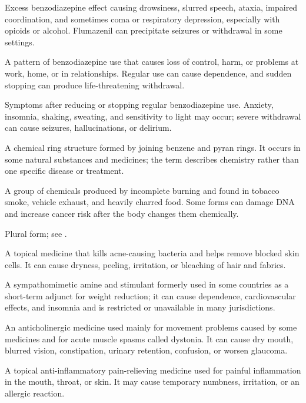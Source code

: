  Excess benzodiazepine effect causing drowsiness, slurred speech, ataxia, impaired coordination, and sometimes coma or respiratory depression, especially with opioids or alcohol. Flumazenil can precipitate seizures or withdrawal in some settings.

 A pattern of benzodiazepine use that causes loss of control, harm, or problems at work, home, or in relationships. Regular use can cause dependence, and sudden stopping can produce life-threatening withdrawal.

 Symptoms after reducing or stopping regular benzodiazepine use. Anxiety, insomnia, shaking, sweating, and sensitivity to light may occur; severe withdrawal can cause seizures, hallucinations, or delirium.

 A chemical ring structure formed by joining benzene and pyran rings. It occurs in some natural substances and medicines; the term describes chemistry rather than one specific disease or treatment.

 A group of chemicals produced by incomplete burning and found in tobacco smoke, vehicle exhaust, and heavily charred food. Some forms can damage DNA and increase cancer risk after the body changes them chemically.

 Plural form; see .

 A topical medicine that kills acne-causing bacteria and helps remove blocked skin cells. It can cause dryness, peeling, irritation, or bleaching of hair and fabrics.

 A sympathomimetic amine and stimulant formerly used in some countries as a short-term adjunct for weight reduction; it can cause dependence, cardiovascular effects, and insomnia and is restricted or unavailable in many jurisdictions.

 An anticholinergic medicine used mainly for movement problems caused by some medicines and for acute muscle spasms called dystonia. It can cause dry mouth, blurred vision, constipation, urinary retention, confusion, or worsen glaucoma.

 A topical anti-inflammatory pain-relieving medicine used for painful inflammation in the mouth, throat, or skin. It may cause temporary numbness, irritation, or an allergic reaction.

